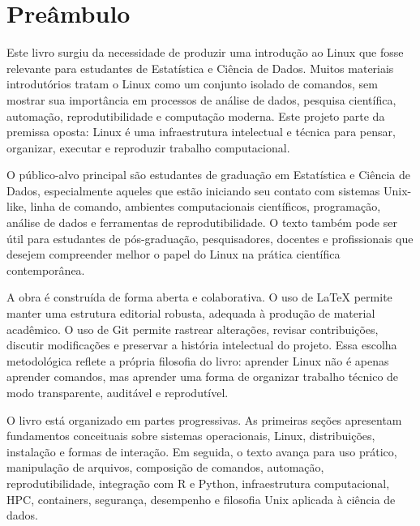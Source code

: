 \documentclass[12pt,openany]{book}
\begin{document}

\cleardoublepage
\chapter*{Preâmbulo}

Este livro surgiu da necessidade de produzir uma introdução ao Linux que fosse relevante para estudantes de Estatística e Ciência de Dados. Muitos materiais introdutórios tratam o Linux como um conjunto isolado de comandos, sem mostrar sua importância em processos de análise de dados, pesquisa científica, automação, reprodutibilidade e computação moderna. Este projeto parte da premissa oposta: Linux é uma infraestrutura intelectual e técnica para pensar, organizar, executar e reproduzir trabalho computacional.

O público-alvo principal são estudantes de graduação em Estatística e Ciência de Dados, especialmente aqueles que estão iniciando seu contato com sistemas Unix-like, linha de comando, ambientes computacionais científicos, programação, análise de dados e ferramentas de reprodutibilidade. O texto também pode ser útil para estudantes de pós-graduação, pesquisadores, docentes e profissionais que desejem compreender melhor o papel do Linux na prática científica contemporânea.

A obra é construída de forma aberta e colaborativa. O uso de LaTeX permite manter uma estrutura editorial robusta, adequada à produção de material acadêmico. O uso de Git permite rastrear alterações, revisar contribuições, discutir modificações e preservar a história intelectual do projeto. Essa escolha metodológica reflete a própria filosofia do livro: aprender Linux não é apenas aprender comandos, mas aprender uma forma de organizar trabalho técnico de modo transparente, auditável e reprodutível.

O livro está organizado em partes progressivas. As primeiras seções apresentam fundamentos conceituais sobre sistemas operacionais, Linux, distribuições, instalação e formas de interação. Em seguida, o texto avança para uso prático, manipulação de arquivos, composição de comandos, automação, reprodutibilidade, integração com R e Python, infraestrutura computacional, HPC, containers, segurança, desempenho e filosofia Unix aplicada à ciência de dados.

\end{document}

